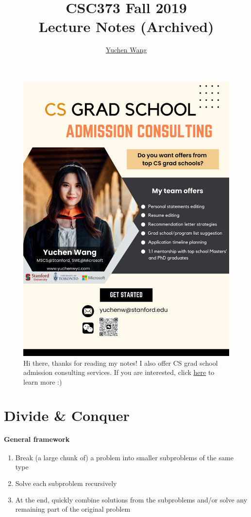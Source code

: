 \documentclass[11pt]{article}
\title{CSC373 Fall 2019 \\ Lecture Notes (Archived)}
\author{\textcolor{blue}{\href{https://www.yuchenwyc.com}{Yuchen Wang}}}
\begin{document}
    \maketitle
    \tableofcontents
    \newpage
\begin{figure}[h]
	\centering
	\includegraphics[scale=0.21]{../ad.png}
	\caption{Hi there, thanks for reading my notes! I also offer CS grad school admission consulting services. If you are interested, click \textcolor{blue}{\href{https://www.yuchenwyc.com/files/admission_consulting.pdf}{here}} to learn more :)}
\end{figure}
\section{Divide \& Conquer}
\paragraph{General framework}
\begin{enumerate}
	\item Break (a large chunk of) a problem into smaller subproblems of the same type
	\item Solve each subproblem recursively
	\item At the end, quickly combine solutions from the subproblems and/or solve any remaining part of the original problem
\end{enumerate}
\end{document}
